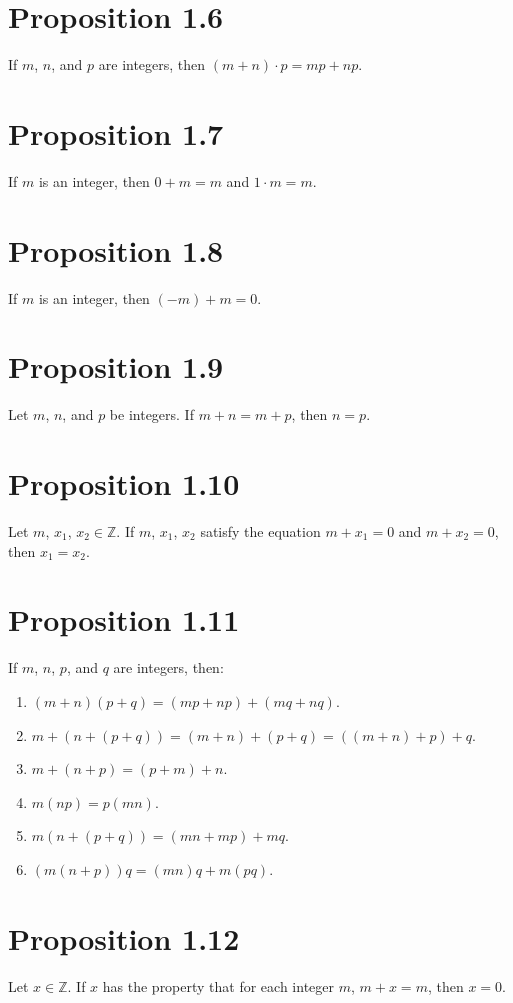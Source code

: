 \section*{Proposition 1.6}
If $m$, $n$, and $p$ are integers, then $(m+n) \cdot p = mp+np$.

\section*{Proposition 1.7}
If $m$ is an integer, then $0+m = m$ and $1 \cdot m = m$.

\section*{Proposition 1.8}
If $m$ is an integer, then $(-m)+m = 0$.

\section*{Proposition 1.9}
Let $m$, $n$, and $p$ be integers. If $m+n = m+ p$, then $n = p$.

\section*{Proposition 1.10}
Let $m$, $x_1$, $x_2 \in \mathbb{Z}$. If $m$, $x_1$, $x_2$ satisfy the equation $m+x_1 = 0$ and $m+x_2 = 0$, then $x_1 = x_2$.

\section*{Proposition 1.11}
If $m$, $n$, $p$, and $q$ are integers, then:
\begin{enumerate}[label=(\roman*)]
    \item $(m+n)(p+q) = (mp+np)+(mq+nq)$.
    \item $m+(n+(p+q)) = (m+n)+(p+q) = ((m+n)+ p)+q$.
    \item $m+(n+ p) = (p+m)+n$.
    \item $m(np) = p(mn)$.
    \item $m(n+(p+q)) = (mn+mp)+mq$.
    \item $(m(n+ p))q = (mn)q+m(pq)$.
\end{enumerate}

\section*{Proposition 1.12}
Let $x \in \mathbb{Z}$. If $x$ has the property that for each integer $m$, $m+x = m$, then $x = 0$.

